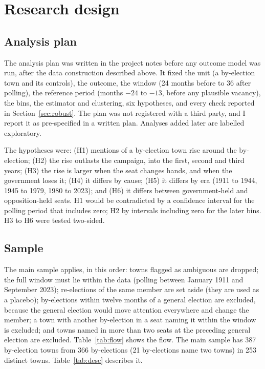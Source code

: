 \documentclass[11pt,a4paper]{article}
\begin{document}
\section{Research design}\label{sec:design}
\subsection{Analysis plan}
The analysis plan was written in the project notes before any outcome model was run, after the data construction described above. It fixed the unit (a by-election town and its controls), the outcome, the window (24 months before to 36 after polling), the reference period (months $-24$ to $-13$, before any plausible vacancy), the bins, the estimator and clustering, six hypotheses, and every check reported in Section~\ref{sec:robust}. The plan was not registered with a third party, and I report it as pre-specified in a written plan. Analyses added later are labelled exploratory.

The hypotheses were: (H1) mentions of a by-election town rise around the by-election; (H2) the rise outlasts the campaign, into the first, second and third years; (H3) the rise is larger when the seat changes hands, and when the government loses it; (H4) it differs by cause; (H5) it differs by era (1911 to 1944, 1945 to 1979, 1980 to 2023); and (H6) it differs between government-held and opposition-held seats. H1 would be contradicted by a confidence interval for the polling period that includes zero; H2 by intervals including zero for the later bins. H3 to H6 were tested two-sided.

\subsection{Sample}
The main sample applies, in this order: towns flagged as ambiguous are dropped; the full window must lie within the data (polling between January 1911 and September 2023); re-elections of the same member are set aside (they are used as a placebo); by-elections within twelve months of a general election are excluded, because the general election would move attention everywhere and change the member; a town with another by-election in a seat naming it within the window is excluded; and towns named in more than two seats at the preceding general election are excluded. Table~\ref{tab:flow} shows the flow. The main sample has 387 by-election towns from 366 by-elections (21 by-elections name two towns) in 253 distinct towns. Table~\ref{tab:desc} describes it.
\end{document}
